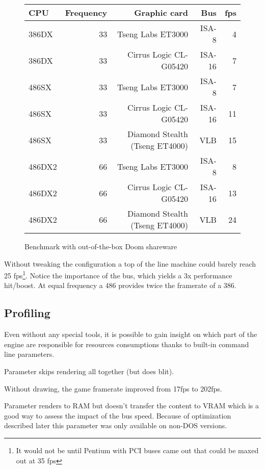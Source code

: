 \begin{figure}[H]
\centering  
\begin{tabularx}{\textwidth}{ L{1}  R{0.3} R{2.4} R{1} R{0.3} }
  \toprule
   \textbf{CPU} & \textbf{Frequency} & \textbf{Graphic card} & \textbf{Bus} & \textbf{fps}\\
  \toprule 
  386DX & 33 & Tseng Labs ET3000    & ISA-8  &  4\\
  386DX\protect\footnotemark & 33 & Cirrus Logic CL-G05420 & ISA-16 &  7\\
  \toprule 
  486SX & 33 & Tseng Labs ET3000                & ISA-8  &  7\\
  486SX & 33 & Cirrus Logic CL-G05420           & ISA-16 & 11\\ 
  486SX & 33 & Diamond Stealth (Tseng ET4000)   & VLB    & 15\\
  \toprule 
  486DX2 & 66 & Tseng Labs ET3000               & ISA-8  &  8\\
  486DX2 & 66 & Cirrus Logic CL-G05420          & ISA-16 & 13\\
  486DX2 & 66 & Diamond Stealth (Tseng ET4000)  & VLB    & 24\\
   \toprule
 \end{tabularx}
\caption{Benchmark with out-of-the-box Doom shareware}
\label{bnechmarsks}
\end{figure}
\par
Without tweaking the configuration a top of the line machine could barely reach 25 fps\footnote{It would not be until Pentium with PCI buses came out that \doom could be maxed out at 35 fps}. Notice the importance of the bus, which yields a 3x performance hit/boost. At equal frequency a 486 provides twice the framerate of a 386.\\
\par






\subsection{Profiling}
Even without any special tools, it is possible to gain insight on which part of the engine are responsible for resources consumptions thanks to built-in command line parameters.\\
\par
Parameter  skips rendering all together (but does blit).\\
\par
\par
{}
\par
Without drawing, the game framerate improved from 17fps to 202fps.\\
\par
Parameter  renders to RAM but doesn't transfer the content to VRAM which is a good way to assess the impact of the bus speed. Because of optimization described later this parameter was only available on non-DOS versions.\\
\par
{}


